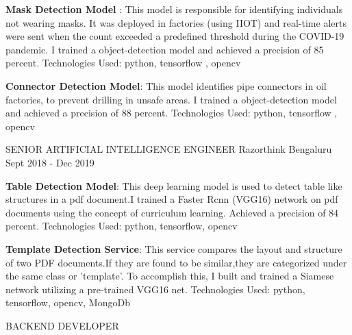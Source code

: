 \begin{cventries}
{\begin{cvitems}
      \item{\textbf {Mask Detection Model} : This model is responsible for identifying individuals not wearing masks. It was deployed in 
      factories (using IIOT) and real-time alerts were sent when the count exceeded a predefined threshold during the 
      COVID-19 pandemic. I trained a  object-detection model 
      and achieved a precision of 85 percent. 
      Technologies Used: python, tensorflow , opencv }
      \item{\textbf{Connector Detection Model}: This model identifies pipe connectors 
      in oil factories, to prevent drilling in unsafe areas. I trained a 
       object-detection model and achieved a precision of 88 percent. 
      Technologies Used: python, tensorflow , opencv}
	\end{cvitems}
    }
\vspace{2em} %
  \cventry
    {SENIOR ARTIFICIAL INTELLIGENCE ENGINEER} %
    {Razorthink} %
    {Bengaluru} %
    {Sept 2018 - Dec 2019} %
    {
      \begin{cvitems} %
        \item{\textbf{Table Detection Model}: This deep learning model is used to 
        detect table like structures in a pdf document.I trained a Faster Rcnn (VGG16) 
        network on pdf documents using the concept of curriculum learning. Achieved a 
        precision of 84 percent. 
        Technologies Used: python, tensorflow, opencv}        
        \item{\textbf{Template Detection Service}: This service compares the layout and 
        structure of two PDF documents.If they are found to be similar,they 
        are categorized under the same class or ’template’. To accomplish this, 
        I built and trained a Siamese network utilizing a pre-trained VGG16 net. 
        Technologies Used: python, tensorflow, opencv, MongoDb}        
	\end{cvitems}
    }
\vspace{2em} %
  \cventry
    {BACKEND DEVELOPER} %

\end{cventries}
